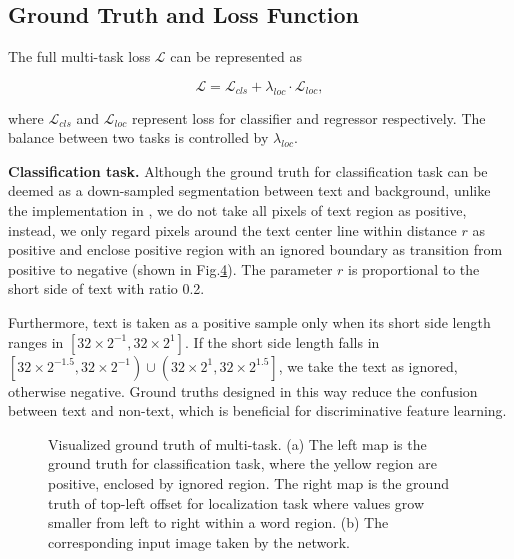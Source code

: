\documentclass[10pt,twocolumn,letterpaper]{article}
\begin{document}
	\subsection{Ground Truth and Loss Function}
	\label{Sec.3.2}
	The full multi-task loss $\mathcal{L}$ can be represented as
	
	\begin{equation}
		\mathcal{L} = \mathcal{L}_{cls} + \lambda_{loc} \cdot \mathcal{L}_{loc},
	\end{equation}
	
	\noindent where $\mathcal{L}_{cls}$ and $\mathcal{L}_{loc}$ represent loss for classifier and regressor respectively. The balance between two tasks is controlled by $\lambda_{loc}$.
	
	\noindent \textbf{Classification task.}
	Although the ground truth for classification task can be deemed as a down-sampled segmentation between text and background, unlike the implementation in \cite{fcn-text}, we do not take all pixels of text region as positive, instead, we only regard pixels around the text center line within distance $r$ as positive and enclose positive region with an ignored boundary as transition from positive to negative (shown in Fig.\hyperref[Fig.4]{4}). The parameter $r$ is proportional to the short side of text with ratio 0.2. 
	
	Furthermore, text is taken as a positive sample only when its short side length ranges in $\left[32 \times 2^{-1}, 32 \times 2^{1} \right]$. If the short side length falls in $\left[32 \times 2^{-1.5},  32 \times 2^{-1}\right) \cup \left(32 \times 2^{1},  32 \times 2^{1.5}\right]$, we take the text as ignored, otherwise negative. Ground truths designed in this way reduce the confusion between text and non-text, which is beneficial for discriminative feature learning.
	
	\begin{figure}
		\label{Fig.4}
		\centering
		
		\caption{Visualized ground truth of multi-task. (a) The left map is the ground truth for classification task, where the yellow region are positive, enclosed by ignored region. The right map is the ground truth of top-left offset for localization task where values grow smaller from left to right within a word region. (b) The corresponding input image taken by the network.}
	\end{figure}
	
\end{document}
